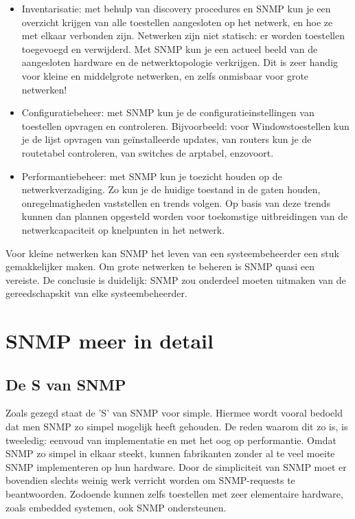 \begin{itemize}
	\item Inventarisatie: met behulp van discovery procedures en SNMP kun je een overzicht krijgen van alle toestellen aangesloten op het netwerk,
	en hoe ze met elkaar verbonden zijn. Netwerken zijn niet statisch: er worden toestellen toegevoegd en verwijderd. Met SNMP kun je een
	actueel beeld van de aangesloten hardware en de netwerktopologie verkrijgen. Dit is zeer handig voor kleine en middelgrote netwerken, en zelfs onmisbaar
	voor grote netwerken!
	
	\item Configuratiebeheer: met SNMP kun je de
	configuratieinstellingen van toestellen opvragen en controleren. Bijvoorbeeld: voor Windowstoestellen kun je de lijst opvragen van geïnstalleerde updates,
	van routers kun je de routetabel controleren, van switches de \gls{arptabel}, enzovoort.
	
	\item Performantiebeheer: met SNMP kun je toezicht houden op de netwerkverzadiging.
	Zo kun je de huidige toestand in de gaten houden,
	onregelmatigheden vaststellen en trends volgen. Op basis van deze trends kunnen dan plannen opgesteld worden voor toekomstige uitbreidingen
	van de netwerkcapaciteit op knelpunten in het netwerk.
\end{itemize}

Voor kleine netwerken kan SNMP het leven van een systeembeheerder een stuk gemakkelijker maken. Om grote netwerken te beheren is SNMP quasi een vereiste.
De conclusie is duidelijk: SNMP zou onderdeel moeten uitmaken van de gereedschapskit van elke systeembeheerder.



\section{SNMP meer in detail}

\subsection{De S van SNMP}

Zoals gezegd staat de 'S' van SNMP voor simple. Hiermee wordt vooral bedoeld dat men SNMP zo simpel mogelijk heeft gehouden.
De reden waarom dit zo is, is tweeledig: eenvoud van implementatie en met het oog op performantie. %
Omdat SNMP zo simpel in elkaar steekt, kunnen fabrikanten zonder al te veel moeite SNMP implementeren op hun hardware.
Door de simpliciteit van SNMP moet er bovendien slechts weinig werk verricht worden om SNMP-requests te beantwoorden.
Zodoende kunnen zelfs toestellen met zeer elementaire hardware, zoals embedded systemen, ook SNMP ondersteunen.


